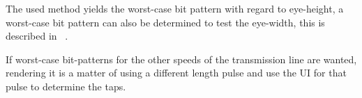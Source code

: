 The used method yields the worst-case bit pattern with regard to eye-height, a worst-case bit pattern can also be determined to test the eye-width, this is described in ~\cite{designcon2011a}.

If worst-case bit-patterns for the other speeds of the transmission line are wanted, rendering it is a matter of using a different length pulse and use the UI for that pulse to determine the taps.